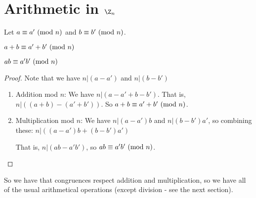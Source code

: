 \documentclass[../Main.tex]{subfiles}
\begin{document}
\section{Arithmetic in \texorpdfstring{$\Z_n$}{Zn}}
\begin{propositions}[Arithmetic in $\Z_n$]{
        Let $a \equiv a'~(\text{mod}~{n})$ and $b \equiv b'~(\text{mod}~{n})$.
        \label{propArithmeticZn}
    }
    \item $a + b \equiv a' + b'~(\text{mod}~{n})$ \label{propAdditionZn}
    \item $a b \equiv a' b'~(\text{mod}~{n})$ \label{propMultZn}
\end{propositions}
\begin{proof}
    Note that we have $n | (a - a')$ and $n | (b - b')$
    \begin{enumerate}
        \item Addition mod $n$:
        We have $n | (a - a' + b - b')$. That is, $n | ((a+b) - (a' + b'))$. So $a + b \equiv a' + b'~(\text{mod}~{n})$.
        \item Multiplication mod $n$:
        We have $n | (a - a')b$ and $n | (b - b')a'$, so combining these: $n | \left((a - a')b + (b - b')a'\right)$\par
        That is, $n | (ab - a'b')$, so $ab \equiv a'b'~(\text{mod}~{n})$.
    \end{enumerate}
\end{proof}
So we have that congruences respect addition and multiplication, so we have all of the usual arithmetical operations (except division - see the next section).
\end{document}
